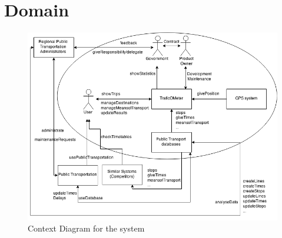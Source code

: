\documentclass[a4paper]{article}
\begin{document}
	\section{Domain}
		\begin{figure}[H]
				\includegraphics[scale=0.50]{img/Context-v3.png}
			\caption{Context Diagram for the system}
		\end{figure}
		
\end{document}
